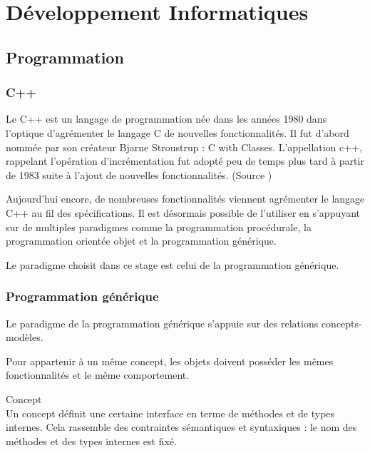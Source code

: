 \section{Développement Informatiques}

\subsection{Programmation}

\subsubsection{C++}

Le C++ est un langage de programmation née dans les années 1980 dans l'optique d'agrémenter le langage C de nouvelles fonctionnalités. Il fut d'abord nommée par son créateur Bjarne Stroustrup : C with Classes. L’appellation c++, rappelant l'opération d'incrémentation fut adopté peu de temps plus tard à partir de 1983 suite à l'ajout de nouvelles fonctionnalités. (Source \cite{Wiki-cpp})

Aujourd'hui encore, de nombreuses fonctionnalités viennent agrémenter le langage C++ au fil des spécifications. Il est désormais possible de l'utiliser en s'appuyant sur de multiples paradigmes comme la programmation procédurale, la programmation orientée objet et la programmation générique.

Le paradigme choisit dans ce stage est celui de la programmation générique. \cite{troussil-cpp}

\subsubsection{Programmation générique}


Le paradigme de la programmation générique s'appuie sur des relations concepts-modèles. 

Pour appartenir à un même concept, les objets doivent posséder les mêmes fonctionnalités et le même comportement. 

\begin{Definition}{Concept}\\
\label{def:cpp-con}
    Un concept définit une certaine interface en terme de méthodes et de types internes. Cela rassemble des contraintes sémantiques et syntaxiques : le nom des méthodes et des types internes est fixé.
\end{Definition}

